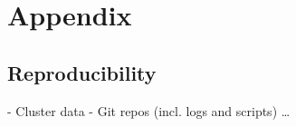 \chapter{Appendix}
\label{chap:appendix}

\section{Reproducibility}
\label{sec:appendix:reproducibility}
- Cluster data
- Git repos (incl. logs and scripts)
\dots